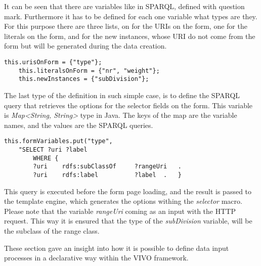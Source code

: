 It can be seen that there are variables like in SPARQL, defined with question mark. Furthermore it has to be defined for each one variable what types are they. For this purpose there are three lists, on for the URIs on the form, one for the literals on the form, and for the new instances, whose URI do not come from the form but will be generated during the data creation.

\begin{lstlisting}[captionpos=b, caption= Variable type definition, label=skullJSON, belowskip=1em, aboveskip=2em,
basicstyle=\footnotesize,frame=single]
	this.urisOnForm = {"type"};
	this.literalsOnForm	= {"nr", "weight"};
	this.newInstances = {"subDivision"};
\end{lstlisting}


The last type of the definition in such simple case, is to define the SPARQL query that retrieves the options for the selector fields on the form. This variable is \textit{Map<String, String>} type in Java. The keys of the map are the variable names, and the values are the SPARQL queries.

\begin{lstlisting}[captionpos=b, caption= Query for form data, label=skullJSON, belowskip=1em, aboveskip=2em,
basicstyle=\footnotesize,frame=single]
this.formVariables.put("type", 
	"SELECT ?uri ?label
		WHERE {
		?uri	rdfs:subClassOf		?rangeUri	.
		?uri	rdfs:label			?label	.	}
\end{lstlisting}

This query is executed before the form page loading, and the result is passed to the template engine, which generates the options withing the \textit{selector} macro. Please note that the variable \textit{rangeUri} coming as an input with the HTTP request. This way it is ensured that the type of the \textit{subDivision} variable, will be the subclass of the range class.

These section gave an insight into how it is possible to define data input processes in a declarative way within the VIVO framework.





